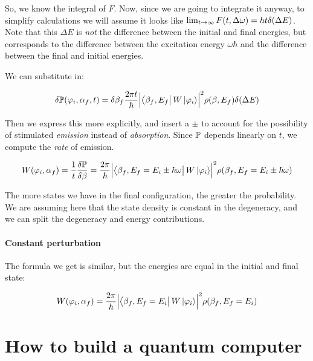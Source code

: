 \documentclass[main.tex]{subfiles}
\begin{document}
So, we know the integral of \(F\). Now, since we are going to integrate it anyway, to simplify calculations we will assume it looks like \(\lim_{t \rightarrow \infty} F\qty(t, \Delta \omega) = h t  \delta(\Delta E)\). Note that this \(\Delta E\) is \emph{not} the difference between the initial and final energies, but corresponds to the difference between the excitation energy \(\omega \hbar\) and the difference between the final and initial energies.

We can substitute in:

\begin{equation}
    \delta \P (\varphi_i, \alpha_f, t)
    = \delta \beta_f \frac{2 \pi t}{\hbar} \abs{\bra{\beta_f, E_f} W \ket{\varphi_i}}^2
    \rho(\beta, E_f) \delta(\Delta E)
\end{equation}

Then we express this more explicitly, and insert a \(\pm\) to account for the possibility of stimulated \emph{emission} instead of \emph{absorption}. Since \(\P\) depends linearly on \(t\), we compute the \emph{rate} of emission.

\begin{equation}
    W(\varphi_i, \alpha_f) = \frac{1}{t} \fdv{\P}{\beta} = \frac{2\pi}{\hbar}
    \abs{\bra{\beta_f, E_f = E_i \pm \hbar \omega} W \ket{\varphi_i}}^2
    \rho (\beta_f, E_f = E_i\pm \hbar \omega)
\end{equation}

The more states we have in the final configuration, the greater the probability. We are assuming here that the state density is constant in the degeneracy, and we can split the degeneracy and energy contributions.

\paragraph{Constant perturbation}

The formula we get is similar, but the energies are equal in the initial and final state:

\begin{equation}
    W(\varphi_i, \alpha_f) = \frac{2\pi}{\hbar}
    \abs{\bra{\beta_f, E_f = E_i} W \ket{\varphi_i}}^2
    \rho (\beta_f, E_f = E_i)
\end{equation}

\section{How to build a quantum computer}
\end{document}
